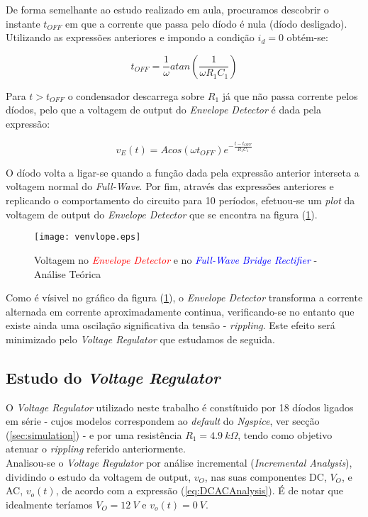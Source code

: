 De forma semelhante ao estudo realizado em aula, procuramos descobrir o instante $t_{OFF}$ em que a corrente 
que passa pelo díodo é nula (díodo desligado). Utilizando as expressões anteriores e impondo a condição $i_d = 0$ obtém-se:

\begin{equation}
    t_{OFF} = \frac{1}{\omega} atan(\frac{1}{\omega R_1 C_1})
\end{equation}

Para $t > t_{OFF}$ o condensador descarrega sobre $R_1$ já que não passa corrente pelos díodos,
pelo que a voltagem de output do \emph{Envelope Detector} é dada pela expressão:

\begin{equation}
    v_E(t) = A cos(\omega t_{OFF}) e^{-\frac{t - t_{OFF}}{R_1 C_1}}
\end{equation}

O díodo volta a ligar-se quando a função dada pela expressão anterior interseta a voltagem normal do \emph{Full-Wave}.
Por fim, através das expressões anteriores e replicando o comportamento do circuito para 10 períodos,
efetuou-se um \emph{plot} da voltagem de output do \emph{Envelope Detector} que se encontra 
na figura (\ref{fig:TeoEnvelopeDetector}).

\begin{figure}[H] \centering
  \texttt{[image: venvlope.eps]}
  \caption{Voltagem no \textcolor{red}{\emph{Envelope Detector}} e no \textcolor{blue}{\emph{Full-Wave Bridge Rectifier}} - Análise Teórica}
  \label{fig:TeoEnvelopeDetector}
\end{figure}

Como é vísivel no gráfico da figura (\ref{fig:TeoEnvelopeDetector}), o \emph{Envelope Detector} transforma a corrente alternada em corrente
aproximadamente continua, verificando-se no entanto que existe ainda uma oscilação significativa da tensão - \emph{rippling}.
Este efeito será minimizado pelo \emph{Voltage Regulator} que estudamos de seguida.



\subsection{Estudo do \emph{Voltage Regulator}}

O \emph{Voltage Regulator} utilizado neste trabalho é constítuido por 18 díodos ligados em série - cujos modelos correspondem ao
\emph{default} do \emph{Ngspice}, ver secção (\ref{sec:simulation}) - e por uma resistência $R_1 = 4.9 \:k\Omega$, tendo como
objetivo atenuar o \emph{rippling} referido anteriormente.
\\
Analisou-se o \emph{Voltage Regulator} por análise incremental (\emph{Incremental Analysis}), dividindo o estudo da
voltagem de output, $v_O$, nas suas componentes DC, $V_O$, e AC, $v_o(t)$, de acordo com a expressão (\ref{eq:DCACAnalysis}).
É de notar que idealmente teríamos $V_O = 12 \: V$ e $v_o(t) = 0 \: V$.

